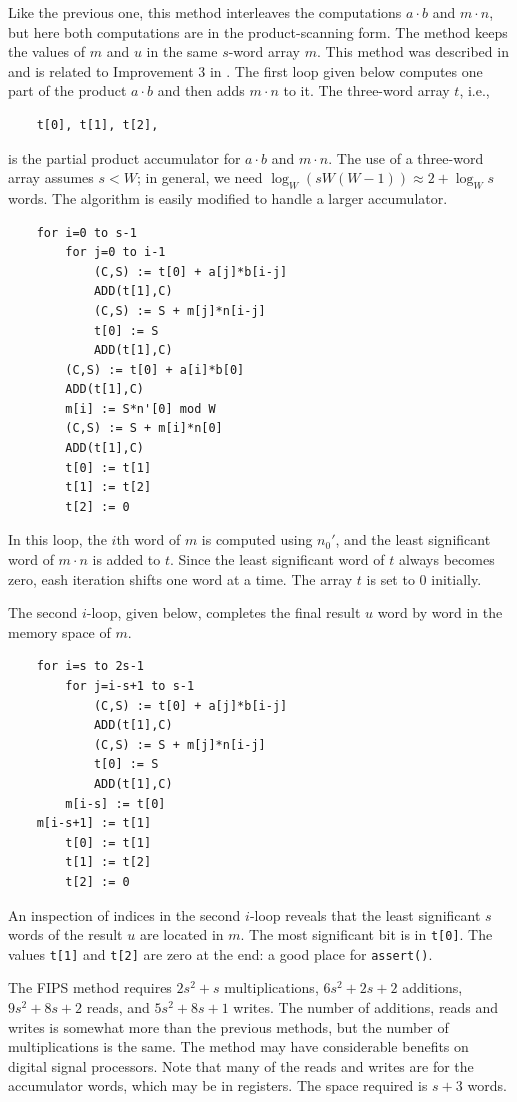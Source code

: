 \documentclass[twocolumn]{svjour3}          %
\begin{document}
Like the previous one, this method interleaves the computations
$a\cdot b$ and $m \cdot n$, but here both computations are in the
product-scanning form. The method keeps the values of $m$ and $u$ in
the same $s$-word array $m$.  This method was described in
\cite{K93:The} and is related to Improvement 3 in \cite{DK90:A}.  The
first loop given below computes one part of the product $a\cdot b$ and
then adds $m\cdot n$ to it.  The three-word array $t$, i.e.,
%
\begin{verbatim}
    t[0], t[1], t[2],
\end{verbatim}
%
is the partial product accumulator for  $a\cdot b$
and $m\cdot n$. The use of a three-word array assumes 
$s < W$; in general, we need $\log_W (sW(W-1)) \approx 2 + \log_W s$
words. The algorithm is easily modified to handle a larger
accumulator.
%
\begin{verbatim}
    for i=0 to s-1
        for j=0 to i-1
            (C,S) := t[0] + a[j]*b[i-j]
            ADD(t[1],C)
            (C,S) := S + m[j]*n[i-j]
            t[0] := S
            ADD(t[1],C)
        (C,S) := t[0] + a[i]*b[0]
        ADD(t[1],C)
        m[i] := S*n'[0] mod W
        (C,S) := S + m[i]*n[0]
        ADD(t[1],C)
        t[0] := t[1]
        t[1] := t[2]
        t[2] := 0
\end{verbatim}
%
In this loop, the $i$th word of $m$ is computed using $n_0'$, and the
least significant word of $m \cdot n$ is added to $t$. Since the least
significant word of $t$ always becomes zero, eash iteration shifts one
word at a time.  The array $t$ is set to 0 initially.

The second $i$-loop, given below, completes the final result $u$ word
by word in the memory space of $m$.
%
\begin{verbatim}
    for i=s to 2s-1
        for j=i-s+1 to s-1
            (C,S) := t[0] + a[j]*b[i-j]
            ADD(t[1],C)
            (C,S) := S + m[j]*n[i-j]
            t[0] := S
            ADD(t[1],C)
        m[i-s] := t[0]
	m[i-s+1] := t[1]
        t[0] := t[1]
        t[1] := t[2]
        t[2] := 0
\end{verbatim}
%
An inspection of indices in the second $i$-loop reveals that the least
significant $s$ words of the result $u$ are located in $m$. The most
significant bit is in \texttt{t[0]}. The values \texttt{t[1]} and
\texttt{t[2]} are zero at the end: a good place for \texttt{assert()}.

The FIPS method requires $2s^2+s$ multiplications, $6s^2+2s+2$
additions, $9s^2+8s+2$ reads, and $5s^2+8s+1$ writes. The number of
additions, reads and writes is somewhat more than the previous
methods, but the number of multiplications is the same.  The method
may have considerable benefits on digital signal processors.
Note that many of the
reads and writes are for the accumulator words, which may be in
registers.  The space required is $s+3$ words.
\end{document}
